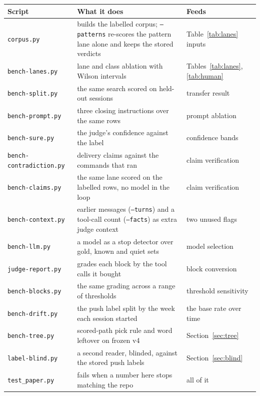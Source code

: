 \begin{center}
{\small\begin{tabular}{lp{6.4cm}p{3.4cm}}
\toprule
Script & What it does & Feeds \\
\midrule
\texttt{corpus.py} & builds the labelled corpus; \texttt{--patterns} re-scores the pattern lane alone and keeps the stored verdicts & Table~\ref{tab:lanes} inputs \\
\texttt{bench-lanes.py} & lane and class ablation with Wilson intervals & Tables~\ref{tab:lanes}, \ref{tab:human} \\
\texttt{bench-split.py} & the same search scored on held-out sessions & transfer result \\
\texttt{bench-prompt.py} & three closing instructions over the same rows & prompt ablation \\
\texttt{bench-sure.py} & the judge's confidence against the label & confidence bands \\
\texttt{bench-contradiction.py} & delivery claims against the commands that ran & claim verification \\
\texttt{bench-claims.py} & the same lane scored on the labelled rows, no model in the loop & claim verification \\
\texttt{bench-context.py} & earlier messages (\texttt{--turns}) and a tool-call count (\texttt{--facts}) as extra judge context & two unused flags \\
\texttt{bench-llm.py} & a model as a stop detector over gold, known and quiet sets & model selection \\
\texttt{judge-report.py} & grades each block by the tool calls it bought & block conversion \\
\texttt{bench-blocks.py} & the same grading across a range of thresholds & threshold sensitivity \\
\texttt{bench-drift.py} & the push label split by the week each session started & the base rate over time \\
\texttt{bench-tree.py} & scored-path pick rule and word leftover on frozen v4 & Section~\ref{sec:tree} \\
\texttt{label-blind.py} & a second reader, blinded, against the stored push labels & Section~\ref{sec:blind} \\
\texttt{test\_paper.py} & fails when a number here stops matching the repo & all of it \\
\bottomrule
\end{tabular}}
\end{center}

